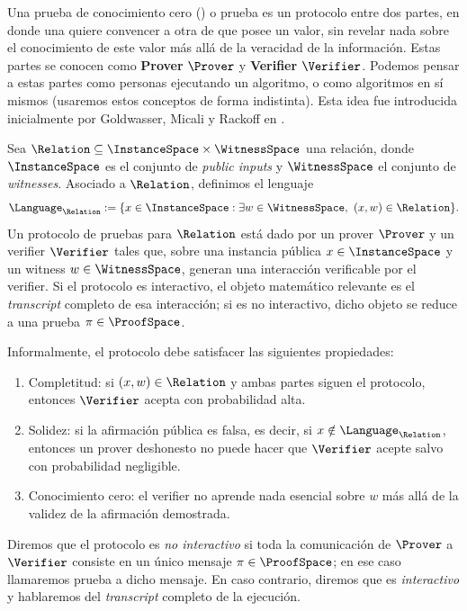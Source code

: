 
Una prueba de conocimiento cero (\ZeroKnowledgeProof) o prueba \ZK es un protocolo entre dos partes, en donde una quiere convencer a otra de que posee un valor, sin revelar nada sobre el conocimiento de este valor más allá de la veracidad de la información. Estas partes se conocen como \textbf{Prover} $\Prover$ y \textbf{Verifier} $\Verifier$. Podemos pensar a estas partes como personas ejecutando un algoritmo, o como algoritmos en sí mismos (usaremos estos conceptos de forma indistinta). Esta idea fue introducida inicialmente por Goldwasser, Micali y Rackoff en \cite{DBLP:journals/siamcomp/GoldwasserMR89}.

\begin{definition}
	Sea $\Relation \subseteq \InstanceSpace \times \WitnessSpace$ una relación, donde $\InstanceSpace$ es el conjunto de \textit{public inputs} y $\WitnessSpace$ el conjunto de \textit{witnesses}. Asociado a $\Relation$, definimos el lenguaje
	$$\Language_\Relation := \{x \in \InstanceSpace : \exists w \in \WitnessSpace,\ (x,w) \in \Relation\}.$$
	Un protocolo de pruebas \ZK para $\Relation$ está dado por un prover $\Prover$ y un verifier $\Verifier$ tales que, sobre una instancia pública $x \in \InstanceSpace$ y un witness $w \in \WitnessSpace$, generan una interacción verificable por el verifier. Si el protocolo es interactivo, el objeto matemático relevante es el \textit{transcript} completo de esa interacción; si es no interactivo, dicho objeto se reduce a una prueba $\pi \in \ProofSpace$.

	Informalmente, el protocolo debe satisfacer las siguientes propiedades:
	\begin{enumerate}[noitemsep]
		\item Completitud: si $(x,w) \in \Relation$ y ambas partes siguen el protocolo, entonces $\Verifier$ acepta con probabilidad alta.
		\item Solidez: si la afirmación pública es falsa, es decir, si $x \notin \Language_\Relation$, entonces un prover deshonesto no puede hacer que $\Verifier$ acepte salvo con probabilidad negligible.
		\item Conocimiento cero: el verifier no aprende nada esencial sobre $w$ más allá de la validez de la afirmación demostrada.
	\end{enumerate}

	Diremos que el protocolo es \textit{no interactivo} si toda la comunicación de $\Prover$ a $\Verifier$ consiste en un único mensaje $\pi \in \ProofSpace$; en ese caso llamaremos prueba a dicho mensaje. En caso contrario, diremos que es \textit{interactivo} y hablaremos del \textit{transcript} completo de la ejecución.
\end{definition}

